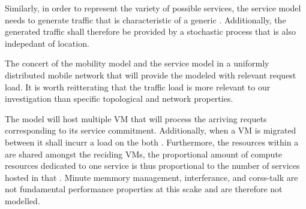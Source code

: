 Similarly, in order to represent the variety of possible services, the service model needs to generate traffic that is characteristic of a generic \ue. Additionally, the generated traffic shall therefore be provided by a stochastic process that is also indepedant of location.

The concert of the mobility model and the service model in a uniformly distributed mobile network that will provide the modeled \dcs with relevant request load. It is worth reitterating that the traffic load is more relevant to our investigation than specific topological and network properties.

The \dc model will host multiple VM that will process the arriving requets corresponding to its service commitment. Additionally, when a VM is migrated between \dcs it shall incurr a load on the both \dcs. Furthermore, the resources within a \dc are shared amongst the reciding VMs, the proportional amount of compute resources dedicated to one service is thus proportional to the number of services hosted in that \dc.  Minute memmory management, interferance, and corss-talk are not fundamental performance properties at this scake and are therefore not modelled.
